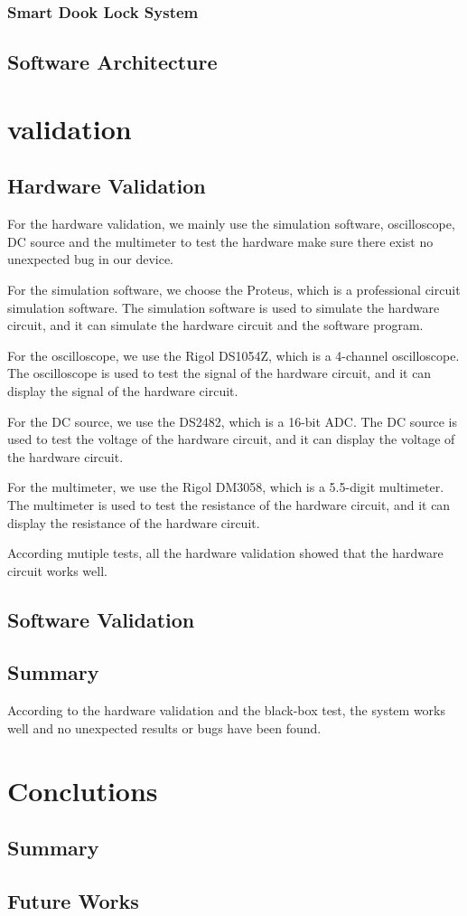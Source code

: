 \documentclass[11pt, a4paper]{article}
\begin{document}
\subsubsection{Smart Dook Lock System}


\subsection{Software Architecture}

\section{validation}
\subsection{Hardware Validation}

For the hardware validation, we mainly use the simulation software, oscilloscope, DC source and the multimeter to test the hardware make sure there exist no unexpected bug in our device.

For the simulation software, we choose the Proteus, which is a professional circuit simulation software.
The simulation software is used to simulate the hardware circuit, and it can simulate the hardware circuit and the software program.

For the oscilloscope, we use the Rigol DS1054Z, which is a 4-channel oscilloscope.
The oscilloscope is used to test the signal of the hardware circuit, and it can display the signal of the hardware circuit.

For the DC source, we use the DS2482, which is a 16-bit ADC.
The DC source is used to test the voltage of the hardware circuit, and it can display the voltage of the hardware circuit.

For the multimeter, we use the Rigol DM3058, which is a 5.5-digit multimeter.
The multimeter is used to test the resistance of the hardware circuit, and it can display the resistance of the hardware circuit.

According mutiple tests, all the hardware validation showed that the hardware circuit works well.
\subsection{Software Validation}

\subsection{Summary}
According to the hardware validation and the black-box test, the system works well and no unexpected results or bugs have been found.

\section{Conclutions}
\subsection{Summary}
\subsection{Future Works}


\nocite{*}
\printbibliography
\end{document}

